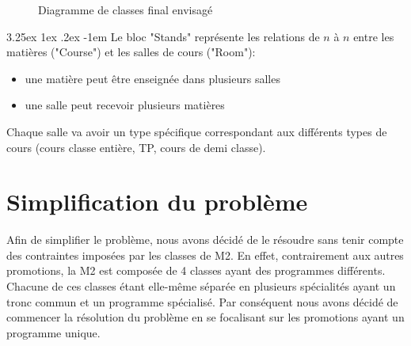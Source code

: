 \documentclass[12pt,a4paper,french]{article}
\makeatletter
\renewcommand\paragraph{\@startsection{paragraph}{5}{\z@}%
  {3.25ex \@plus1ex \@minus.2ex}%
  {-1em}%
  {\normalfont\normalsize\bfseries}}
\makeatother
\begin{document}
\begin{figure}[! ht ]
    \centering
    \begin{minipage}[t]{14 cm}
        \centering
        \caption {Diagramme de classes final envisagé}
    \end{minipage}
\end{figure}

\paragraph{}
Le bloc "Stands" représente les relations de $n$ à $n$ entre les matières ("Course") et les salles de cours ("Room"):
\begin{itemize}
\item une matière peut être enseignée dans plusieurs salles
\item une salle peut recevoir plusieurs matières
\end{itemize}

Chaque salle va avoir un type spécifique correspondant aux différents types de cours (cours classe entière, TP, cours de demi classe).

\newpage
\section{Simplification du problème}
Afin de simplifier le problème, nous avons décidé de le résoudre sans tenir compte des contraintes imposées par les classes de M2. 
En effet, contrairement aux autres promotions, la M2 est composée de 4 classes ayant des programmes différents. Chacune de ces classes étant elle-même séparée en plusieurs spécialités ayant un tronc commun et un programme spécialisé.
Par conséquent nous avons décidé de commencer la résolution du problème en se focalisant sur les promotions ayant un programme unique.\\
\end{document}
